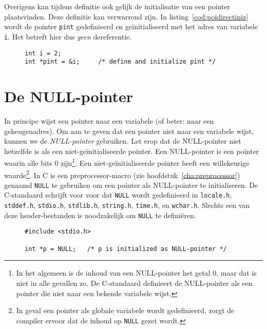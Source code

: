 Overigens kan tijdens definitie ook gelijk de initialisatie van een pointer plaatsvinden. Deze definitie kan verwarrend zijn. In listing~\ref{cod:poidirectiniz} wordt de pointer \texttt{pint} gedefinieerd en geïnitialiseerd met het adres van variabele \texttt{i}. Het betreft hier dus \textsl{geen} dereferentie.

\begin{figure}[!ht]
\begin{lstlisting}[caption=Definitie en initialisatie van een pointer.,label=cod:poidirectiniz]
int i = 2;
int *pint = &i;     /* define and initialize pint */
\end{lstlisting}
\end{figure}


\section{De NULL-pointer}
\label{sec:nullpointer}
In principe wijst een pointer naar een variabele (of beter: naar een geheugenadres). Om aan te geven dat een pointer niet naar een variabele wijst, kunnen we de \textsl{NULL-pointer} gebruiken. Let erop dat de NULL-pointer niet hetzelfde is als een niet-geïnitialiseerde pointer. Een NULL-pointer is een pointer waarin alle bits 0 zijn\footnote{In het algemeen is de inhoud van een NULL-pointer het getal 0, maar dat is niet in alle gevallen zo. De C-standaard definieert de NULL-pointer als een pointer die niet naar een bekende variabele wijst.}. Een niet-geïnitialiseerde pointer heeft een willekeurige waarde\footnote{In geval een pointer als globale variabele wordt gedefinieerd, zorgt de compiler ervoor dat de inhoud op \texttt{NULL} gezet wordt.}. In C is een preprocessor-macro (zie hoofdstuk~\ref{cha:preprocessor}) genaamd \texttt{NULL} te gebruiken om een pointer als NULL-pointer te initialiseren. De C-standaard schrijft voor voor dat \texttt{NULL} wordt gedefinieerd in \texttt{locale.h}, \texttt{stddef.h}, \texttt{stdio.h}, \texttt{stdlib.h}, \texttt{string.h}, \texttt{time.h}, en \texttt{wchar.h}. Slechts een van deze header-bestanden is noodzakelijk om \texttt{NULL} te definiëren.

\begin{figure}[!ht]
\begin{lstlisting}[caption=Definitie en initialisatie van een NULL-pointer.]
#include <stdio.h>

int *p = NULL;   /* p is initialized as NULL-pointer */
\end{lstlisting}
\end{figure}

